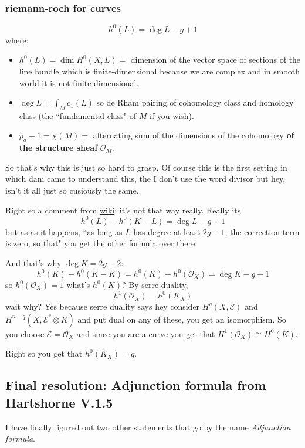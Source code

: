 \subsubsection{riemann-roch for curves}

\[\boxed{h^{0}(L)=\operatorname{deg}L-g+1}\]
where:
\begin{itemize}
\item \(h^0(L)=\dim H^{0}(X,L)=\) dimension of the vector space of sections of the line bundle which is finite-dimensional because we are complex and in smooth world it is not finite-dimensional.
\item \(\operatorname{deg}L=\int_M c_1(L)\) so de Rham pairing of cohomology class and homology  class (the ``fundamental class" of \(M\) if you wish).
 \item \(p_a-1=\chi(M)=\) alternating sum of the dimensions of the cohomology \textbf{of the structure sheaf} \(\mathcal{O}_M\).
\end{itemize}
So that's why this is just so hard to grasp. Of course this is the first setting in which dani came to understand this, the I don't use the word divisor but hey, isn't it all just so cusiously the same.

Right so a comment from \href{https://en.wikipedia.org/wiki/Riemann%E2%80%93Roch_theorem}{wiki}: it's not that way really. Really its
	\[\boxed{h^0(L)-h^0(K-L)=\operatorname{deg}L-g+1}\]
	but as as it happens, ``as long as \(L\) has degree at least \(2g-1\), the correction term is zero, so that" you get the other formula over there.

And that's why \(\operatorname{deg}K=2g-2\):
\[h^0(K)-h^0(K-K)=h^0(K)-h^0(\mathcal{O}_X)=\operatorname{deg}K-g+1\]
so \(h^0(\mathcal{O}_X)=1\) what's \(h^0(K)\)? By serre duality,
\[h^1(\mathcal{O}_X)=h^0(K_X)\]
wait why? Yes because serre duality says hey consider \(H^q(X,\mathcal{E})\) and \(H^{n-q}(X,\mathcal{E}^* \otimes K)\) and put dual on any of these, you get an isomorphism. So you choose \(\mathcal{E}=\mathcal{O}_X\) and since you are a curve you get that \(H^{1}(\mathcal{O}_X)\cong H^{0}(K)\).

Right so you get that \(h^0(K_X)=g\).

\subsection{Final resolution: Adjunction formula from Hartshorne V.1.5}

I have finally figured out two other statements that go by the name \textit{Adjunction formula}.

